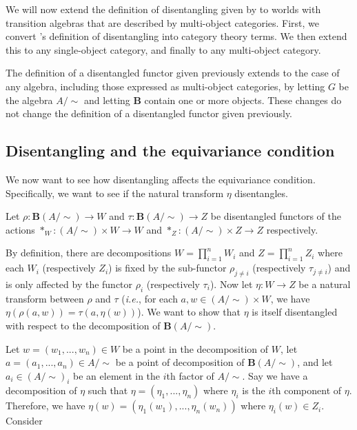 We will now extend the definition of disentangling given by \autocite{Higgins2018} to worlds with transition algebras that are described by multi-object categories.
First, we convert \autocite{Higgins2018}'s definition of disentangling into category theory terms.
We then extend this to any single-object category, and finally to any multi-object category.

The definition of a disentangled functor given previously extends to the case of any algebra, including those expressed as multi-object categories, by letting $G$ be the algebra $A/\sim$ and letting $\textbf{B}$ contain one or more objects.
These changes do not change the definition of a disentangled functor given previously.

\subsection{Disentangling and the equivariance condition}

We now want to see how disentangling affects the equivariance condition. Specifically, we want to see if the natural transform $\eta$ disentangles.

Let $\rho: \textbf{B}(A/\sim) \to W$ and $\tau: \textbf{B}(A/\sim) \to Z$ be disentangled functors of the actions $*_{W}: (A/\sim) \times W \to W$ and $*_{Z}: (A/\sim) \times Z \to Z$ respectively.


By definition, there are decompositions $W = \prod_{i=1}^{n} W_{i}$ and $Z = \prod_{i=1}^{n} Z_{i}$ where each $W_{i}$ (respectively $Z_{i}$) is fixed by the sub-functor $\rho_{j\neq i}$ (respectively $\tau_{j\neq i}$) and is only affected by the functor $\rho_{i}$ (respectively $\tau_{i}$).
Now let $\eta: W \to Z$ be a natural transform between $\rho$ and $\tau$ (\textit{i.e.}, for each $a, w \in (A/\sim) \times W$, we have $\eta(\rho(a, w)) = \tau(a, \eta(w))$).
We want to show that $\eta$ is itself disentangled with respect to the decomposition of $\textbf{B}(A/\sim)$.

Let $w = (w_{1},..., w_{n}) \in W$ be a point in the decomposition of $W$, let $a = (a_{1},...,a_{n}) \in A/\sim$ be a point of decomposition of $\textbf{B}(A/\sim)$, and let $a_{i} \in (A/\sim)_{i}$ be an element in the $i$th factor of $A/\sim$.
Say we have a decomposition of $\eta$ such that $\eta = (\eta_{1}, ..., \eta_{n})$ where $\eta_{i}$ is the $i$th component of $\eta$.
Therefore, we have $\eta(w) = (\eta_{1}(w_{1}), ..., \eta_{n}(w_{n}))$ where $\eta_{i}(w) \in Z_{i}$.
Consider

